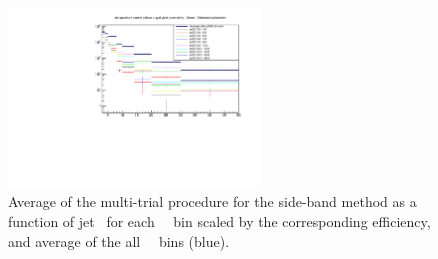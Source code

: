 \begin{figure}[bth]
\begin{center}
\includegraphics[width=0.6\textwidth]{pPbcuts_2sig/multi_trial/cDistrAllAvgs.pdf}
\caption{Average of the multi-trial procedure for the side-band method as a function of jet \pt\ for each \Dzero\ \pt\ bin scaled by the corresponding efficiency, and average of the all \Dzero\ \pt\ bins (blue).} 
\label{fig:MultiTrialSB_trials_pPB_Dzero}
\end{center}
\end{figure}

